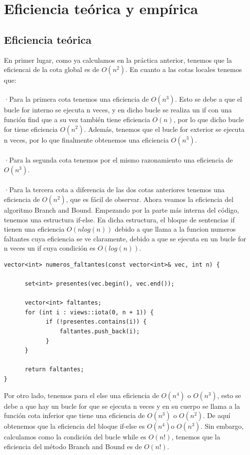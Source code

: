 \documentclass[11pt,openany]{book}
\begin{document}
\newpage


\section{Eficiencia teórica y empírica}
\subsection{Eficiencia teórica}

En primer lugar, como ya calculamos en la práctica anterior, tenemos que la eficiencai de la cota global es de $O(n^2)$. En cuanto a las cotas locales tenemos
que: \\\\
·Para la primera cota tenemos una eficiencia de $O(n^3)$. Esto se debe a que el bucle for interno se ejecuta n veces, y en dicho bucle se realiza un if con 
una función find que a su vez también tiene eficiencia $O(n)$, por lo que dicho bucle for tiene eficiencia $O(n^2)$. Además, tenemos que el bucle for exterior 
se ejecuta n veces, por lo que finalmente obtenemos una eficiencia $O(n^3)$.\\\\
·Para la segunda cota tenemos por el mismo razonamiento una eficiencia de $O(n^3)$.\\\\
·Para la tercera cota a diferencia de las dos cotas anteriores tenemos una eficiencia de $O(n^2)$, que es fácil de observar.
Ahora veamos la eficiencia del algoritmo Branch and Bound. Empezando por la parte más interna del código, tenemos una estructura if-else. En dicha estructura,
el bloque de sentencias if tienen una eficiencia $O(nlog(n))$ debido a que llama a la funcion numeros faltantes cuya eficiencia se ve claramente, debido a que 
se ejecuta en un bucle for n veces un if cuya condición es $O(log(n))$.


\begin{lstlisting}
vector<int> numeros_faltantes(const vector<int>& vec, int n) {
            
      set<int> presentes(vec.begin(), vec.end());
        
      vector<int> faltantes;
      for (int i : views::iota(0, n + 1)) {
            if (!presentes.contains(i)) {
                faltantes.push_back(i);
            }
      }
        
      return faltantes;
}
\end{lstlisting}
Por otro lado, tenemos para el else una eficiencia de $O(n^4)$ o $O(n^3)$, esto se debe a que hay un bucle for que se ejecuta n veces y en su cuerpo se llama a la función 
cota inferior que tiene una eficiencia de $O(n^3)$ o $O(n^2)$. De aquí obtenemos que la eficiencia del bloque if-else es $O(n^4)$o $O(n^3)$. Sin embargo, calculamos como la condición del bucle while es $O(n!)$,
tenemos que la eficiencia del método Branch and Bound es de $O(n!)$. 
\end{document}

